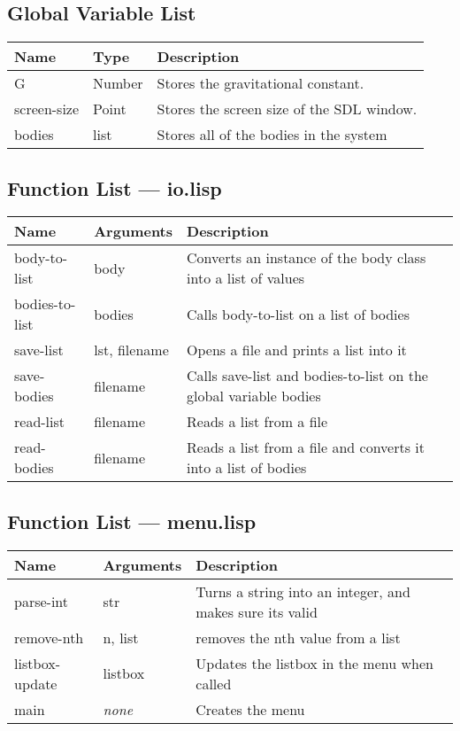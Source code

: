 \subsection{Global Variable List}
\begin{tabular}{p{}p{}p{}}
	Name & Type & Description \\ \hline
	G & Number & Stores the gravitational constant.\\
	screen-size & Point & Stores the screen size of the SDL window. \\
	bodies & list & Stores all of the bodies in the system \\

\end{tabular}

\subsection{Function List --- io.lisp}
\begin{tabular}{p{}p{}p{}}
	Name & Arguments & Description\\ \hline
	body-to-list & body & Converts an instance of the body class into a list
	of values \\ 
	bodies-to-list & bodies & Calls body-to-list on a list of bodies \\
	save-list & lst, filename & Opens a file and prints a list into it \\
	save-bodies & filename & Calls save-list and bodies-to-list on the
	global variable bodies \\
	read-list & filename & Reads a list from a file \\
	read-bodies & filename & Reads a list from a file and converts it into a
	list of bodies \\ 
\end{tabular}

\subsection{Function List --- menu.lisp}
\begin{tabular}{p{}p{}p{}}
	Name & Arguments & Description\\ \hline
	parse-int & str & Turns a string into an integer, and makes sure its
	valid \\
	remove-nth &n, list & removes the nth value from a list \\
	listbox-update & listbox & Updates the listbox in the menu when called
	\\
	main & \emph{none}  & Creates the menu \\
\end{tabular}

